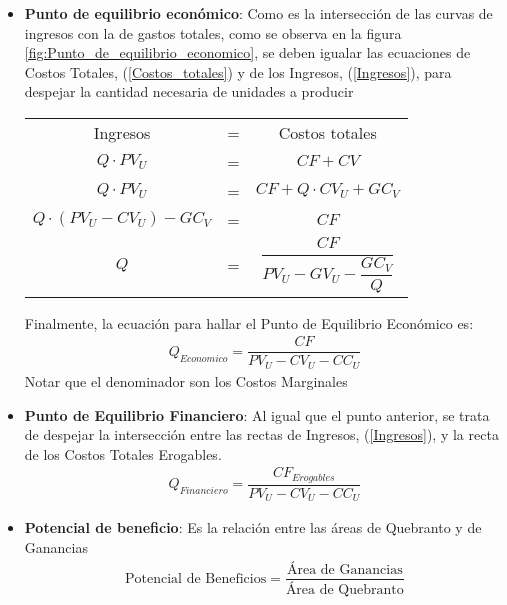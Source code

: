 \documentclass[12pt,a4paper]{article}
\begin{document}
\begin{itemize}
			\item	\textbf{Punto de equilibrio económico}: Como es la intersección de las curvas de ingresos con la de gastos totales, como se observa en la figura \ref{fig:Punto_de_equilibrio_economico}, se deben igualar las ecuaciones de Costos Totales, (\ref{Costos_totales}) y de los Ingresos, (\ref{Ingresos}), para despejar la cantidad necesaria de unidades a producir
            		\begin{table}[H]
                    \centering
                    	\begin{tabular}{ c c c}
                        	Ingresos			&=&	Costos totales\\[0.2cm]
                            $Q \cdot {PV}_{U}$	&=&	$CF + CV$\\[0.2cm]
                            $Q \cdot {PV}_{U}$	&=&	$CF + Q \cdot {CV}_{U} + {GC}_{V}$\\[0.2cm]
                            $Q \cdot ( {PV}_{U} - {CV}_{U} ) - {GC}_{V} $	&=&	$CF$\\[0.2cm]
                            $ Q $	&=&	$ \dfrac{CF}{ {PV}_{U} - {GV}_{U} - \dfrac{{GC}_{V}}{Q} } $\\[0.2cm]
						\end{tabular}
					\end{table}
                    Finalmente, la ecuación para hallar el Punto de Equilibrio Económico es:
                    \begin{align}
                    	Q_{Economico} = \dfrac{ CF }{ {PV}_{U} - {CV}_{U} - {CC}_{U} }
                        \label{Punto_de_equilibrio_Economico}
					\end{align}
                    Notar que el denominador son los Costos Marginales
                    
			\item	\textbf{Punto de Equilibrio Financiero}: Al igual que el punto anterior, se trata de despejar la intersección entre las rectas de Ingresos, (\ref{Ingresos}), y la recta de los Costos Totales Erogables.
					\begin{align}
                    	Q_{Financiero} = \dfrac{ CF_{Erogables} }{ {PV}_{U} - {CV}_{U} - {CC}_{U} }
                        \label{Punto_de_equilibrio_Financiero}
					\end{align}
            
            \item	\textbf{Potencial de beneficio}: Es la relación entre las áreas de Quebranto y de Ganancias
            		\begin{align}
                    	\text{Potencial de Beneficios} = \dfrac{ \text{Área de Ganancias} }{ \text{Área de Quebranto} }
					\end{align}
            
		\end{itemize}
        
\end{document}
